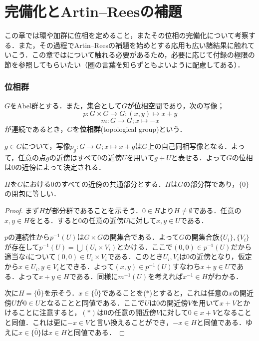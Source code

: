 \part[Completion，and Artin--Rees lemma]{完備化とArtin--Reesの補題}

この章では環や加群に位相を定めること，またその位相の完備化について考察する．また，その過程でArtin--Reesの補題を始めとする応用も広い諸結果に触れていこう．この章ではについて触れる必要があるため，必要に応じて付録の極限の節を参照してもらいたい（圏の言葉を知らずともよいように配慮してある）．
\section{位相群}

\begin{defi}[位相群]
	$G$をAbel群とする．また，集合として$G$が位相空間であり，次の写像；
	\[p:G\times G\to G;(x,y)\mapsto x+y\]
	\[m:G\to G;x\mapsto -x\]
	が連続であるとき，$G$を\textbf{位相群}(topological group)という．
\end{defi}

$g\in G$について，写像$p_g:G\to G;x\mapsto x+g$は$G$上の自己同相写像となる．よって，任意の点$g$の近傍はすべて$0$の近傍$U$を用いて$g+U$と表せる．よって$G$の位相は$0$の近傍によって決定される．

\begin{prop}
	$H$を$G$における$0$のすべての近傍の共通部分とする．$H$は$G$の部分群であり，$\{0\}$の閉包に等しい．
\end{prop}

\begin{proof}
	まず$H$が部分群であることを示そう．$0\in H$より$H\neq\emptyset$である．任意の$x,y\in H$をとる．すると$0$の任意の近傍$U$に対して$x,y\in U$である．
	
	$p$の連続性から$p^{-1}(U)$は$G\times G$の開集合である．よって$G$の開集合族$\{U_i\},\{V_i\}$が存在して$p^{-1}(U)=\bigcup (U_i\times V_i)$とかける．ここで$(0,0)\in p^{-1}(U)$だから適当な$i$について$(0,0)\in U_i\times V_i$である．このとき$U_i,V_i$は$0$の近傍となり，仮定から$x\in U_i,y\in V_i$とできる．よって$(x,y)\in p^{-1}(U)$すなわち$x+y\in U$である．よって$x+y\in H$である．同様に$m^{-1}(U)$を考えれば$x^{-1}\in H$がわかる．
	
	次に$H=\bar{\{0\}}$を示そう．$x\in\bar{\{0\}}$であることを($\ast$)とすると，これは任意の$x$の開近傍$U$が$0\in U$となることと同値である．ここで$U$は$0$の開近傍$V$を用いて$x+V$とかけることに注意すると，$(\ast)$は$0$の任意の開近傍$V$に対して$0\in x+V$となることと同値．これは更に$-x\in V$と言い換えることができ，$-x\in H$と同値である．ゆえに$x\in\bar{\{0\}}$は$x\in H$と同値である．
\end{proof}

